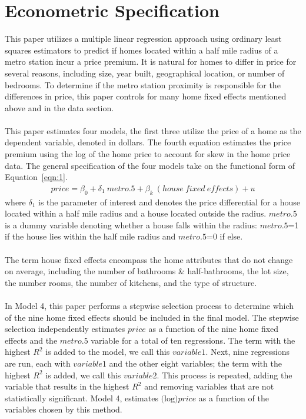 \documentclass[12pt]{report}
\newcommand\tab[1][.60cm]{\hspace*{#1}}
\begin{document}
\clearpage

\section*{Econometric Specification}
This paper utilizes a multiple linear regression approach using ordinary least squares estimators to predict if homes located within a half mile radius of a metro station incur a price premium. It is natural for homes to differ in price for several reasons, including size, year built, geographical location, or number of bedrooms. To determine if the metro station proximity is responsible for the differences in price, this paper controls for many home fixed effects mentioned above and in the data section.\\ \\
\tab This paper estimates four models, the first three utilize the price of a home as the dependent variable, denoted in dollars. The fourth equation estimates the price premium using the log of the home price to account for skew in the home price data. The general specification of the four models take on the functional form of Equation~\ref{eqn:1}.
\begin{align}
\ price = \beta_0 +\delta_1\ metro.5 + \beta_k\ (house\ fixed\ effects )+ u \ 
\label{eqn:1}
\end{align}
where $\delta_1$ is the parameter of interest and denotes the price differential for a house located within a half mile radius and a house located outside the radius. $metro.5$ is a dummy variable denoting whether a house falls within the radius: $metro.5$=1 if the house lies within the half mile radius and $metro.5$=0 if else.\\ \\
\tab The term house fixed effects encompass the home attributes that do not change on average, including the number of bathrooms \& half-bathrooms, the lot size, the number rooms, the number of kitchens, and the type of structure.\\ \\
\tab In Model 4, this paper performs a stepwise selection process to determine which of the nine home fixed effects should be included in the final model. The stepwise selection independently estimates $price$ as a function of the nine home fixed effects and the $metro.5$ variable for a total of ten regressions. The term with the highest $R^2$ is added to the model, we call this $variable1$. Next, nine regressions are run, each with $variable1$ and the other eight variables; the term with the highest $R^2$ is added, we call this $variable2$. This process is repeated, adding the variable that results in the highest $R^2$ and removing variables that are not statistically significant. Model 4, estimates $\text{(log)}price$ as a function of the variables chosen by this method. \\ \\
\end{document}
